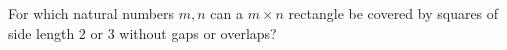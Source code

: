 For which natural numbers $m,n$ can a $m\times n$ rectangle be covered by
squares of side length $2$ or $3$ without gaps or overlaps?